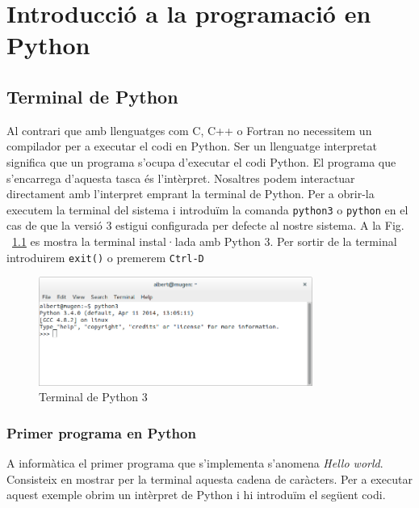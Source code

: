 \chapter{Introducció a la programació en Python}


\section{Terminal de Python}

Al contrari que amb llenguatges com C, C++ o Fortran no necessitem un compilador per a executar el codi en Python. Ser un llenguatge interpretat significa que un programa s'ocupa d'executar el codi Python. El programa que s'encarrega d'aquesta tasca és l'intèrpret. Nosaltres podem interactuar directament amb l'interpret emprant la terminal de Python. Per a obrir-la executem la terminal del sistema i introduïm la comanda {\tt python3} o {\tt python} en el cas de que la versió 3 estigui configurada per defecte al nostre sistema. A la Fig. ~\ref{fig:python-term} es mostra la terminal instal·lada amb Python 3.  Per sortir de la terminal introduirem {\tt exit()} o premerem {\tt Ctrl-D}

\begin{figure}[!h]
    \begin{centering}
    \includegraphics[width=0.8\textwidth]{img/python-term.png}
    \caption{Terminal de Python 3}
    \label{fig:python-term}
    \end{centering}
\end{figure}


\subsection{Primer programa en Python}


A informàtica el primer programa que s'implementa s'anomena \emph{Hello world}. Consisteix en mostrar per la terminal aquesta cadena de caràcters. Per a executar aquest exemple obrim un intèrpret de Python i hi introduïm el següent codi.



